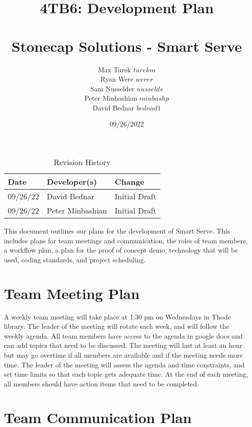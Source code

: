 \documentclass{article}
\title{%
\textbf{4TB6: Development Plan\\\progname}\\
\addlinespace
\addlinespace
\addlinespace
\addlinespace
\large \textbf{Stonecap Solutions - Smart Serve}
\addlinespace
\addlinespace
\addlinespace
\addlinespace}
\author{Max Turek $turekm$\\Ryan Were $werer$\\Sam Nusselder $nusselds$\\Peter Minbashian $minbashp$\\David Bednar $bednad1$}
\date{09/26/2022}
\begin{document}
\maketitle
\newpage
\tableofcontents
\addlinespace
\addlinespace
\addlinespace
\addlinespace

\begin{table}[hp]
\caption{Revision History} \label{TblRevisionHistory}
\begin{tabularx}{\textwidth}{llX}
\toprule
\textbf{Date} & \textbf{Developer(s)} & \textbf{Change}\\
\midrule
09/26/22 & David Bednar & Initial Draft\\
09/26/22 & Peter Minbashian & Initial Draft \\
\bottomrule
\end{tabularx}
\end{table}

\newpage

\maketitle

This document outlines our plans for the development of Smart Serve. This includes plans for team meetings and communication, the roles of team members, a workflow plan, a plan for the proof of concept demo, technology that will be used, coding standards, and project scheduling.

\section{Team Meeting Plan}

A weekly team meeting will take place at 1:30 pm on Wednesdays in Thode library. The leader of the meeting will rotate each week, and will follow the weekly agenda. All team members have access to the agenda in google docs and can add topics that need to be discussed. The meeting will last at least an hour but may go overtime if all members are available and if the meeting needs more time. The leader of the meeting will assess the agenda and time constraints, and set time limits so that each topic gets adequate time. At the end of each meeting, all members should have action items that need to be completed.

\section{Team Communication Plan}
\end{document}
